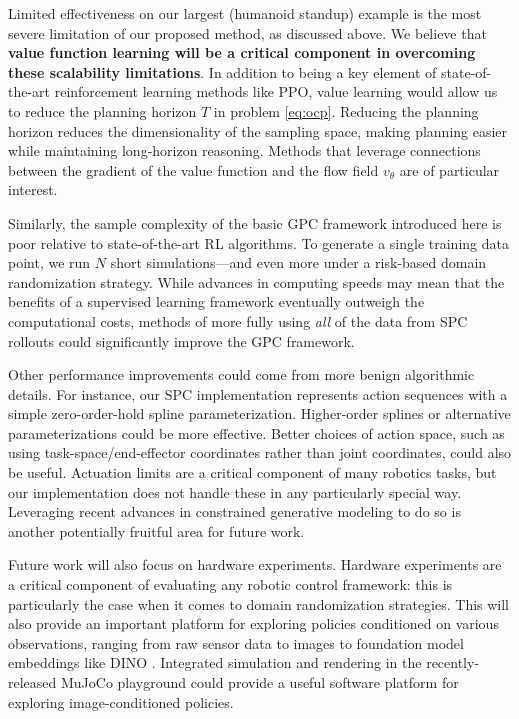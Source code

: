 \documentclass[letterpaper, 10 pt]{ieeeconf}
\begin{document}
Limited effectiveness on our largest (humanoid standup) example is the most severe limitation of our proposed method, as discussed above. We believe that \textbf{value function learning will be a critical component in overcoming these scalability limitations}. In addition to being a key element of state-of-the-art reinforcement learning methods like PPO, value learning would allow us to reduce the planning horizon $T$ in problem \ref{eq:ocp}. Reducing the planning horizon reduces the dimensionality of the sampling space, making planning easier while maintaining long-horizon reasoning. Methods that leverage connections between the gradient of the value function and the flow field $v_\theta$ are of particular interest.

Similarly, the sample complexity of the basic GPC framework introduced here is poor relative to state-of-the-art RL algorithms. To generate a single training data point, we run $N$ short simulations---and even more under a risk-based domain randomization strategy. While advances in computing speeds may mean that the benefits of a supervised learning framework eventually outweigh the computational costs, methods of more fully using \textit{all} of the data from SPC rollouts could significantly improve the GPC framework.

Other performance improvements could come from more benign algorithmic details. For instance, our SPC implementation \cite{kurtz2024hydrax} represents action sequences with a simple zero-order-hold spline parameterization. Higher-order splines \cite{howell2022predictive} or alternative parameterizations could be more effective. Better choices of action space, such as using task-space/end-effector coordinates rather than joint coordinates, could also be useful. Actuation limits are a critical component of many robotics tasks, but our implementation does not handle these in any particularly special way. Leveraging recent advances in constrained generative modeling \cite{fishman2024diffusion, fishman2024metropolis,kurtz2024equality} to do so is another potentially fruitful area for future work. 

Future work will also focus on hardware experiments. Hardware experiments are a critical component of evaluating any robotic control framework: this is particularly the case when it comes to domain randomization strategies. This will also provide an important platform for exploring policies conditioned on various observations, ranging from raw sensor data to images to foundation model embeddings like DINO \cite{oquab2023dinov2}. Integrated simulation and rendering in the recently-released MuJoCo playground \cite{mujoco_playground_2025} could provide a useful software platform for exploring image-conditioned policies. 
\end{document}
